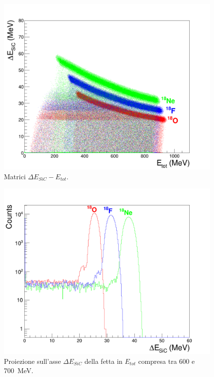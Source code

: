 \begin{figure} [!p]
	\centering
	\includegraphics[width=\textwidth, keepaspectratio]{Grafici_Tesi/Particelle_non_monocromatiche/deltaE_ETot_full_energy.png}
	\caption{Matrici $\Delta E_{SiC} - E_{tot}$.} \label{fig:deltaE_ETot_full_energy}
\end{figure}

\begin{figure} [!p]
	\centering
	\includegraphics[width=\textwidth, keepaspectratio]{Grafici_Tesi/Particelle_non_monocromatiche/fetta_quadrata.png}
	\caption{Proiezione sull'asse $\Delta E_{SiC}$ della fetta in $E_{tot}$ compresa tra 600 e 700~MeV.} \label{fig:fetta}
\end{figure}




